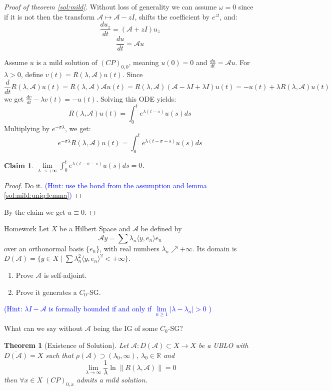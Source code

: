 \documentclass[12pt, oneside]{book}
\newtheorem{theo}{Theorem}[section]
\newtheorem{claim}{Claim}[section]
\newcommand{\norm}[1]{\left\lVert#1\right\rVert}
\newcommand{\A}{\mathscr{A}}
\begin{document}
\begin{proof}[Proof of theorem \ref{sol:mild}]
	Without loss of generality we can assume $\omega = 0$ since if it is not then the transform $\A \mapsto \A - zI$, shifts the coefficient by $e^{zt}$, and:
	$$
	\frac{du_z}{dt} = (\A +zI)u_z
	$$
	$$
	\frac{du}{dt} = \A u
	$$


Assume $u$ is a mild solution of $(CP)_{0,0}$, meaning $u(0)=0$ and $\frac{du}{dt} = \A u$. For $\lambda > 0$, define $v(t) = R(\lambda, \A)u(t)$. Since
$$
\frac{d}{dt} R(\lambda, \A)u(t) = R(\lambda, \A) \A u(t) = R(\lambda, \A)(\A - \lambda I + \lambda I)u(t) = -u(t) + \lambda R(\lambda, \A)u(t)$$
we get $\frac{dv}{dt} - \lambda v(t) = -u(t)$. 
Solving this ODE yields:
$$
R(\lambda, \A)u(t) = \int_0^t e^{\lambda(t-s)} u(s) ds
$$
Multiplying by $e^{- \sigma \lambda}$, we get:
$$
e^{- \sigma \lambda}R(\lambda, \A)u(t) = \int_0^t e^{\lambda(t - \sigma - s)} u(s) ds
$$

\begin{claim}
	$\lim\limits_{\lambda \to +\infty} \int_0^t e^{\lambda(t - \sigma - s)} u(s) ds = 0$.
\end{claim}

\begin{proof}
	Do it. \textcolor{blue}{(Hint: use the bond from the assumption and lemma \ref{sol:mild:uniq:lemma})}
\end{proof}

By the claim we get $u \equiv 0$.
\end{proof}

\begin{exercise}{Homework}{}
Let $X$ be a Hilbert Space and $\A$ be defined by 
$$
\A y = \sum \lambda_n \langle y, e_n \rangle e_n
$$
over an orthonormal basis $\{e_n\}$, with real numbers $\lambda_n \nearrow +\infty$. Its domain is ${D(\A) = \{ y \in X \mid \sum \lambda_n^2 \langle y, e_n \rangle^2 < +\infty \}}$. 
\begin{enumerate}
    \item Prove $\A$ is self-adjoint.
    \item Prove it generates a $C_0$-SG.
\end{enumerate}
\textcolor{blue}{(Hint: $\lambda I - \A$ is formally bounded if and only if $\lim\limits_{n \ge 1} \left| \lambda - \lambda_n \right| > 0$ )}
\end{exercise}

What can we say without $\A$ being the IG of some $C_0$-SG?

\begin{theo}[Existence of Solution]
Let $\A: D(\A) \subset X \to X$ be a UBLO with $\overline{D(\A)} = X$ such that $\rho(\A) \supset (\lambda_0, \infty)$, $\lambda_0 \in \mathbb{R}$ and
$$
\lim\limits_{\lambda \to \infty} \frac{1}{\lambda} \ln \norm{R(\lambda, \A)} = 0
$$
then $\forall x \in X \; (CP)_{0, x}$ admits a mild solution.
\end{theo}
\end{document}
